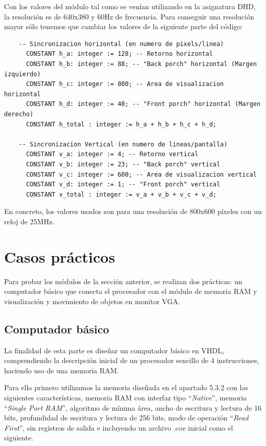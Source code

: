 Con los valores del módulo tal como se venían utilizando en la asignatura DHD, la resolución es de 640x380 y 60Hz de frecuencia. Para conseguir una 
resolución mayor sólo tenemos que cambiar los valores de la siguiente parte del código:

\begin{lstlisting}
    -- Sincronizacion horizontal (en numero de pixels/linea)
      CONSTANT h_a: integer := 128; -- Retorno horizontal
      CONSTANT h_b: integer := 88; -- "Back porch" horizontal (Margen izquierdo)
      CONSTANT h_c: integer := 800; -- Area de visualizacion horizontal 
      CONSTANT h_d: integer := 40; -- "Front porch" horizontal (Margen derecho)  
      CONSTANT h_total : integer := h_a + h_b + h_c + h_d;  
       
    -- Sincronizacion Vertical (en numero de lineas/pantalla)  
      CONSTANT v_a: integer := 4; -- Retorno vertical
      CONSTANT v_b: integer := 23; -- "Back porch" vertical
      CONSTANT v_c: integer := 600; -- Area de visualizacion vertical 
      CONSTANT v_d: integer := 1; -- "Front porch" vertical 
      CONSTANT v_total : integer := v_a + v_b + v_c + v_d;  
\end{lstlisting}

En concreto, los valores usados son para una resolución de 800x600 píxeles con un reloj de 25MHz.

\section{Casos prácticos}

Para probar los módulos de la sección anterior, se realizan dos prácticas: un computador básico que conecta el procesador con el
módulo de memoria RAM y visualización y movimiento de objetos en monitor VGA.

\subsection{Computador básico}

La finalidad de esta parte es diseñar un computador básico en VHDL, comprendiendo la descripción inicial de un procesador sencillo 
de 4 instrucciones, haciendo uso de una memoria RAM.

Para ello primero utilizamos la memoria diseñada en el apartado 5.3.2 con las siguientes características, memoria RAM con interfaz tipo ``\textit{Native}'', 
memoria ``\textit{Single Port RAM}'', algoritmo de mínima área, ancho de escritura y lectura de 16 bits, profundidad de escritura 
y lectura de 256 bits, modo de operación ``\textit{Read First}'', sin registros de salida e incluyendo un archivo .coe inicial como 
el siguiente.

